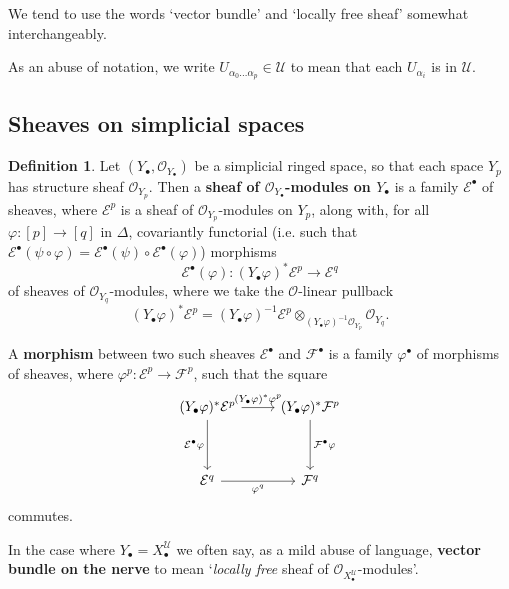 \documentclass[11pt,fleqn]{article}
\theoremstyle{plain}
\theoremstyle{definition}
\newtheorem{definition}[theorem]{Definition}
\theoremstyle{remark}
\numberwithin{equation}{theorem}
\newcommand{\cover}{\mathcal{U}}
\newcommand{\OO}{\mathcal{O}}
\newcommand{\define}[1]{\textbf{#1}}
\newcommand{\nerve}[1]{X_{#1}^\cover}
\begin{document}
        \medskip

        We tend to use the words `vector bundle' and `locally free sheaf' somewhat interchangeably.

        \medskip

        As an abuse of notation, we write $U_{\alpha_0\ldots\alpha_p}\in\cover$ to mean that each $U_{\alpha_i}$ is in $\cover$.


    \subsection{Sheaves on simplicial spaces}

        \begin{definition}\label{definition:sheaf-on-a-simplicial-space}
            Let $(Y_\bullet,\OO_{Y_\bullet})$ be a simplicial ringed space, so that each space $Y_p$ has structure sheaf $\OO_{Y_p}$.
            Then a \define{sheaf of $\OO_{Y_\bullet}$-modules on $Y_\bullet$} is a family $\mathcal{E}^\bullet$ of sheaves, where $\mathcal{E}^p$ is a sheaf of $\OO_{Y_p}$-modules on $Y_p$, along with, for all $\varphi\colon[p]\to[q]$ in $\Delta$, covariantly functorial (i.e. such that $\mathcal{E}^\bullet(\psi\circ\varphi) = \mathcal{E}^\bullet(\psi)\circ \mathcal{E}^\bullet(\varphi)$) morphisms
            \[
                \mathcal{E}^\bullet(\varphi) \colon (Y_\bullet\varphi)^*\mathcal{E}^p \to \mathcal{E}^q
            \]
            of sheaves of $\OO_{Y_q}$-modules, where we take the $\OO$-linear pullback
            \[
                (Y_\bullet\varphi)^*\mathcal{E}^p
                =
                (Y_\bullet\varphi)^{-1}\mathcal{E}^p
                \otimes_{(Y_\bullet\varphi)^{-1}\OO_{Y_p}}
                \OO_{Y_q}.
            \]

            A \define{morphism} between two such sheaves $\mathcal{E}^\bullet$ and $\mathcal{F}^\bullet$ is a family $\varphi^\bullet$ of morphisms of sheaves, where $\varphi^p\colon \mathcal{E}^p\to \mathcal{F}^p$, such that the square
            \[
                \begin{tikzcd}[row sep=huge]
                    (Y_\bullet\varphi)^*\mathcal{E}^p
                        \ar[r,"(Y_\bullet\varphi)^*\varphi^p"]
                        \ar[d,swap,"\mathcal{E}^\bullet\varphi"]
                &   (Y_\bullet\varphi)^*\mathcal{F}^p
                        \ar[d,"\mathcal{F}^\bullet\varphi"]
                \\  \mathcal{E}^q
                        \ar[r,swap,"\varphi^q"]
                &   \mathcal{F}^q
                \end{tikzcd}
            \]
            commutes.

            In the case where $Y_\bullet=\nerve{\bullet}$ we often say, as a mild abuse of language, \define{vector bundle on the nerve} to mean `\emph{locally free} sheaf of $\OO_{\nerve{\bullet}}$-modules'.
        \end{definition}
\end{document}
